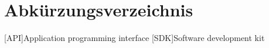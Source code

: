 \chapter{Abkürzungsverzeichnis}
\begin{acronym}[SDK]
[API]{Application programming interface}
[SDK]{Software development kit}
\end{acronym}